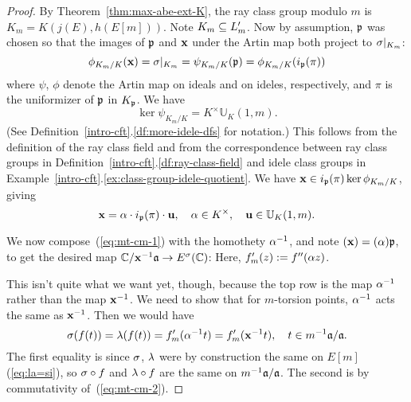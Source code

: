 \begin{proof}
By Theorem~\ref{thm:max-abe-ext-K}, the ray class group modulo $m$ is $K_m=K(j(E),h(E[m]))$. Note $K_m\subseteq L_m'$. 
Now by assumption, $\mathfrak{p}$ was chosen so that the images of $\mathfrak{p}$ and $\mathbf{x}$ under the Artin map both project to $\sigma|_{K_m}$:
\[
\phi_{K_m/K}(\mathbf{x})=\sigma|_{K_m} =\psi_{K_m/K}(\mathfrak{p})=\phi_{K_m/K}(i_{\mathfrak{p}}(\pi))
\]
where $\psi$, $\phi$ denote the Artin map on ideals and on ideles, respectively, and $\pi$ is the uniformizer of $\mathfrak{p}$ in $K_{\mathfrak{p}}$. We have
\[
\ker\psi_{K_m/K}=K^{\times}\mathbb U_K(1,m).
\]
(See Definition~\ref{intro-cft}.\ref{df:more-idele-dfs} for notation.) This follows from the definition of the ray class field and from the correspondence between ray class groups in Definition~\ref{intro-cft}.\ref{df:ray-class-field} and idele class groups in Example~\ref{intro-cft}.\ref{ex:class-group-idele-quotient}. 
We have $\mathbf{x}\in i_{\mathfrak{p}}(\pi)\ker \phi_{K_m/K}$, giving
\[
\mathbf{x}=\alpha\cdot  i_{\mathfrak{p}}(\pi)\cdot  \mathbf u,\quad \alpha\in K^{\times},\quad \mathbf u\in \mathbb U_K(1,m).
\]


We now compose~(\ref{eq:mt-cm-1}) with the homothety $\alpha^{-1}$, and note $(\mathbf{x})=(\alpha)\mathfrak{p}$, to get the desired map $\mathbb{C}/\mathbf{x}^{-1}\mathfrak{a}\to E^{\sigma}(\mathbb{C})$:
\eeq
Here, $f'_m(z):=f''(\alpha z)$.

This isn't quite what we want yet, though, because the top row is the map $\alpha^{-1}$ rather than the map $\mathbf{x}^{-1}$. We need to show that for $m$-torsion points, $\alpha^{-1}$ acts the same as $\mathbf{x}^{-1}$. Then we would have
\[
\sigma(f(t))=\lambda(f(t))=f'_m(\alpha^{-1}t)=f'_m(\mathbf{x}^{-1}t),\quad t\in m^{-1}\mathfrak{a}/\mathfrak{a}.
\]
The first equality is since $\sigma$, $\lambda$ were by construction the same on $E[m]$ (\ref{eq:la=si}), so $\sigma\circ f$ and $\lambda\circ f$ are the same on $m^{-1}\mathfrak{a}/\mathfrak{a}$. The second is by commutativity of~(\ref{eq:mt-cm-2}).


\end{proof}
